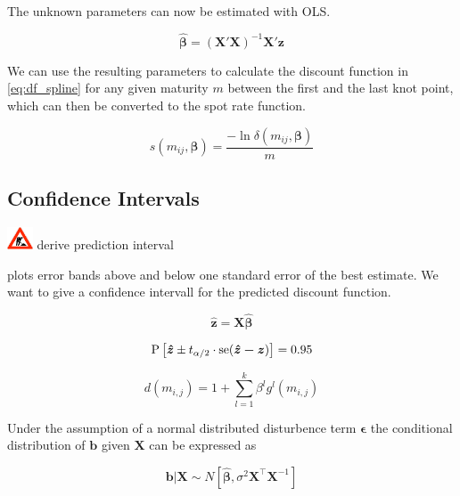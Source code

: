        
The unknown parameters can now be estimated with OLS.
	
\begin{equation}
\label{eq:paramspline}
\bm{\hat \beta}= \left( \bm{X}' \bm{X}\right )^{-1}\bm{X}' \bm{z}
\end{equation}


We can use the resulting parameters to calculate the discount function in \eqref{eq:df_spline} for any given maturity $m$ between the first and the last knot point, which can then be converted to the spot rate function.



\begin{equation}
  \label{eq:transformdf}
  s(m_{ij},\bm{\beta}) = \frac{-\ln \delta(m_{ij},\bm{\beta})}{m}
\end{equation}


\subsection{Confidence Intervals}\includegraphics[width=0.3in]{baustelle} derive prediction interval



\cite{McCulloch1975} plots error bands above and below one standard error of the best estimate. We want to give a confidence intervall for the predicted discount function.

\begin{equation}
  \label{eq:yhat}
  \bm{\hat{z}}=\bm{X}\bm{\hat{\beta}}
\end{equation}


\begin{equation}
  \label{eq:predint}
 \mbox{P}\left[\bm{\hat{z}}\pm t_{\alpha/2}\cdot \operatorname*{se}(\bm{\hat{z}-z})\right]=0.95
\end{equation}


\begin{equation}
  \label{eq:printvdf}
  d(m_{i,j})=1+\sum_{l=1}^k\beta^lg^l(m_{i,j})
\end{equation}



\cite{Greene2002}
Under the assumption of a normal distributed disturbence term $\bm{\epsilon}$ the conditional distribution of $\bm{b}$ given $\bm{X}$ can be expressed as


\begin{equation}
  \label{eq:bddistrb}
  \bm{b}|\bm{X} \sim N\left[\bm{\hat \beta}, \sigma^2\bm{X^\top}\bm{X}^{-1}\right]
\end{equation}

